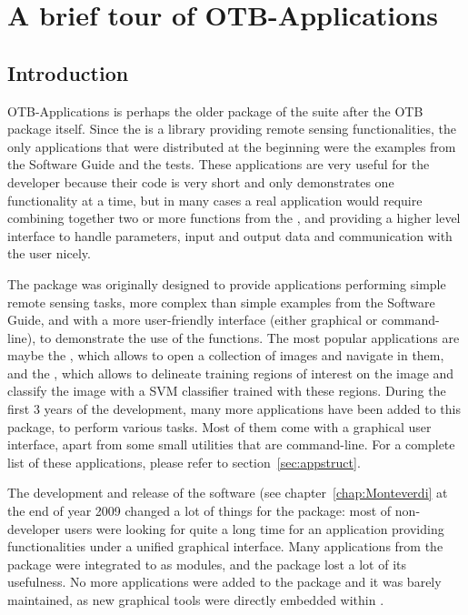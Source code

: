 \chapter{A brief tour of OTB-Applications}\label{chap:otb-applications}

\section{Introduction}\label{sec:appintro}

OTB-Applications is perhaps the older package of the \otb
suite after the OTB package itself. Since the \otb is a
library providing remote sensing functionalities, the only
applications that were distributed at the beginning were the examples
from the Software Guide and the tests. These applications are very
useful for the developer because their code is very short and only
demonstrates one functionality at a time, but in many cases a real
application would require combining together two or more functions
from the \otb, and providing a higher level interface to
handle parameters, input and output data and communication with the
user nicely.

The \app package was originally designed to provide applications
performing simple remote sensing tasks, more complex than simple
examples from the Software Guide, and with a more user-friendly
interface (either graphical or command-line), to demonstrate the use
of the \otb functions. The most popular applications are maybe the
, which allows to open a collection
of images and navigate in them, and the
, which allows to
delineate training regions of interest on the image and classify the
image with a SVM classifier trained with these regions. During the
first 3 years of the \otb development, many more applications have
been added to this package, to perform various tasks. Most of them
come with a graphical user interface, apart from some small utilities
that are command-line.  For a complete list of these applications,
please refer to section~\ref{sec:appstruct}.

The development and release of the \mont software (see
chapter~\ref{chap:Monteverdi} at the end of year 2009 changed a lot of
things for the \app package: most of non-developer users were looking
for quite a long time for an application providing \otb
functionalities under a unified graphical interface. Many applications
from the \app package were integrated to \mont as modules, and the
\app package lost a lot of its usefulness. No more applications were
added to the package and it was barely maintained, as new graphical
tools were directly embedded within \mont.


